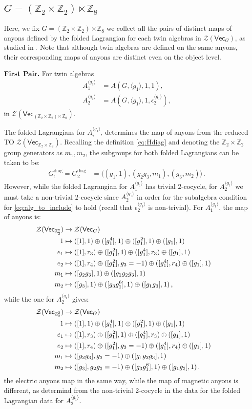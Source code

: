 \documentclass[aps,twocolumn,prx,floatfix,preprintnumbers, nofootinbib,10pt]{revtex4-2}
\numberwithin{equation}{section}
\theoremstyle{definition}
\newcommand{\be}{\begin{equation}}
\newcommand{\ee}{\end{equation}}
\newcommand{\ba}{\begin{aligned}}
\newcommand{\ea}{\end{aligned}}
\newcommand{\Z}{{\mathbb Z}}
\newcommand{\cZ}{\mathcal{Z}}
\renewcommand{\Vec}{\mathsf{Vec}}
\newcommand{\eps}{\epsilon}
\newcommand{\diag}{\text{diag}}
\begin{document}
\subsection{$G=(\Z_2\times \Z_2)\ltimes \Z_8$}

Here, we fix $G = (\Z_2 \times \Z_2) \ltimes \Z_8 $ we collect all the pairs of distinct maps of anyons defined by the folded Lagrangian for each twin algebras in $\cZ(\Vec_{G})$, as studied in . Note that although twin algebras are defined on the same anyons, their corresponding maps of anyons are distinct even on the object level.

\vspace{2mm}
\noindent\textbf{First Pair.}
For twin algebras
\begin{align}
    A_1^{\langle g_1\rangle} & =A(G,\langle g_1\rangle,1,1), \\
    A_2^{\langle g_1\rangle} & =A(G,\langle g_1\rangle,1,\epsilon^{\langle g_1\rangle}_2),
\end{align}
in $\cZ(\Vec_{(\Z_2 \times \Z_2) \ltimes \Z_8 })$.

The folded Lagrangians for $A_i^{\langle g_1\rangle}$, determines the map of anyons from the reduced TO $\cZ(\Vec_{\Z_2\times\Z_2})$. Recalling the definition \eqref{eq:Hdiag} and denoting the $\Z_2\times\Z_2$ group generators as $m_1,m_2$, the subgroups for both folded Lagrangians can be taken to be:
\be\ba
    G^\diag_1=G^\diag_2&=\langle (g_1,1), (g_2g_3,m_1), (g_3,m_2) \rangle\,.
\ea\ee 
However, while the folded Lagrangian for $A_1^{\langle g_1\rangle}$
has trivial 2-cocycle, for  $A_2^{\langle g_1\rangle}$ we must take a non-trivial 2-cocycle since $A_2^{\langle g_1\rangle}$ in order for the subalgebra condition for \eqref{eq:alg_to_include} to hold (recall that $\eps_2^{\langle g_1\rangle}$ is non-trivial).
For $A_1^{\langle g_1\rangle}$, the map of anyons is:
\be\ba 
\cZ(\Vec_{\Z_2^2}) & \rightarrow \cZ(\Vec_G) \cr
1  &\mapsto  ([1],1) \oplus ([g_1^4],1) \oplus ([g_1^2],1) \oplus ([g_1],1)\cr
e_1  &\mapsto  ([1],r_3) \oplus ([g_1^2],1) \oplus ([g_1^4],r_3) \oplus ([g_1],1)\cr
e_2  &\mapsto  ([1],r_4) \oplus ([g_1^2],g_3=-1) \oplus ([g_1^4], r_4) \oplus ([g_1],1)\cr
m_1  &\mapsto   ([g_2g_3],1) \oplus ([g_1g_2g_3],1)\cr
m_2  &\mapsto  ([g_3],1) \oplus ([g_3g_1^6],1) \oplus ([g_1g_3],1)\,,
\ea\ee
while the one for  $A_2^{\langle g_1\rangle} $ gives:
\be\ba 
\cZ(\Vec_{\Z_2^2}) & \rightarrow \cZ(\Vec_G) \cr
1  &\mapsto  ([1],1) \oplus ([g_1^4],1) \oplus ([g_1^2],1) \oplus ([g_1],1)\cr
e_1  &\mapsto  ([1],r_3) \oplus ([g_1^2],1) \oplus ([g_1^4],r_3) \oplus ([g_1],1)\cr
e_2  &\mapsto  ([1],r_4) \oplus ([g_1^2],g_3=-1) \oplus ([g_1^4], r_4) \oplus ([g_1],1)\cr
m_1  &\mapsto  ([g_2g_3],g_3=-1) \oplus ([g_1g_2g_3],1)\cr
m_2  &\mapsto  ([g_3],g_2g_3=-1) \oplus ([g_3g_1^6],1) \oplus ([g_1g_3],1)\,.
\ea\ee
the electric anyons map in the same way, while the map of magnetic anyons is different, as determind from the non-trivial 2-cocycle in the data for the folded Lagrangian data for $A_2^{\langle g_1\rangle}$.
\end{document}
